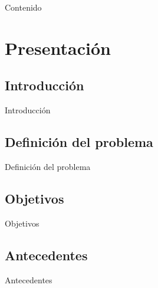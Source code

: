 \documentclass[10pt, hyperref={pdfpagelabels=false}]{beamer}
\begin{document}


   \begin{frame}{Contenido}
    \tableofcontents[hideallsubsections]
   \end{frame}

  \section{Presentación}
    \subsection{Introducción}
      \begin{frame}{Introducción}

      \end{frame}

    \subsection{Definición del problema}
      \begin{frame}{Definición del problema}

      \end{frame}

    \subsection{Objetivos}
      \begin{frame}{Objetivos}

      \end{frame}

    \subsection{Antecedentes}
      \begin{frame}{Antecedentes}

      \end{frame}
\end{document}
